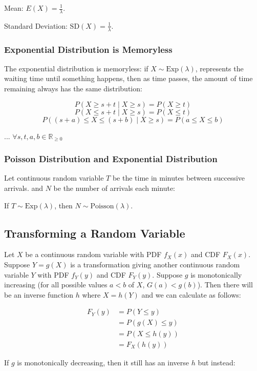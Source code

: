 Mean: $E(X) = \frac{1}{\lambda}$.

Standard Deviation: $\text{SD}(X) = \frac{1}{\lambda}$.

\subsubsection*{Exponential Distribution is Memoryless}

The exponential distribution is memoryless: if $X \sim \text{Exp}(\lambda)$, represents the waiting time until something happens, then as time passes, the amount of time remaining always has the same distribution:

$$ P(X \geq s + t \mid X \geq s) = P(X \geq t) $$
$$ P(X \leq s + t \mid X \geq s) = P(X \leq t) $$
$$ P((s+a) \leq X \leq (s+b) \mid X \geq s) = P(a \leq X \leq b) $$

... $\forall s,t,a,b \in \mathbb{R}_{\geq 0}$

\subsubsection*{Poisson Distribution and Exponential Distribution}

Let continuous random variable $T$ be the time in minutes between successive arrivals. and $N$ be the number of arrivals each minute:

If $T\sim \text{Exp}(\lambda)$, then $N \sim \text{Poisson}(\lambda)$.

\subsection*{Transforming a Random Variable}

Let $X$ be a continuous random variable with PDF $f_X(x)$ and CDF $F_X(x)$.
Suppose $Y=g(X)$ is a transformation giving another continuous random variable $Y$ with PDF $f_Y(y)$ and CDF $F_Y(y)$.
Suppose $g$ is monotonically increasing (for all possible values $a<b$ of $X$, $G(a) < g(b)$). 
Then there will be an inverse function $h$ where $X = h(Y)$ and we can calculate as follows:

\begin{align*}
     F_Y(y) &= P(Y \leq y) \\
     &= P(g(X)\leq y) \\
     &= P(X \leq h(y)) \\
     &= F_X(h(y))
\end{align*}

If $g$ is monotonically decreasing, then it still has an inverse $h$ but instead:

